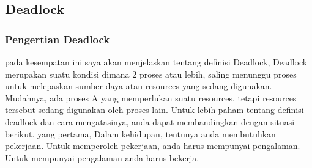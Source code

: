 \subsection {Deadlock}
\subsubsection {Pengertian Deadlock}
pada kesempatan ini saya akan menjelaskan tentang definisi Deadlock, Deadlock merupakan suatu kondisi dimana 2 proses atau lebih, saling menunggu proses untuk melepaskan sumber daya atau resources yang sedang digunakan. Mudahnya, ada proses A yang memperlukan suatu resources, tetapi resources tersebut sedang digunakan oleh proses lain.
Untuk lebih paham tentang definisi deadlock dan cara mengatasinya, anda dapat membandingkan dengan situasi berikut. yang pertama, Dalam kehidupan, tentunya anda membutuhkan pekerjaan. Untuk memperoleh pekerjaan, anda harus mempunyai pengalaman. Untuk mempunyai pengalaman anda harus bekerja.